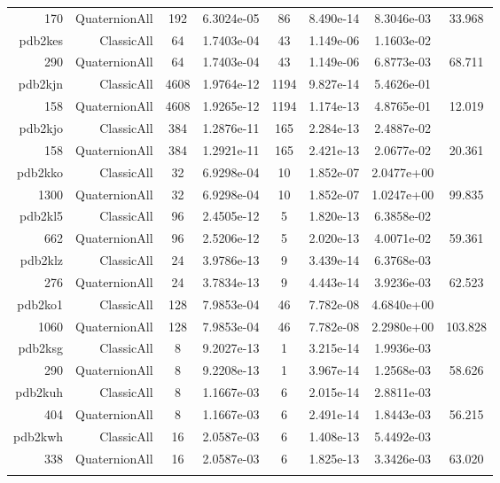 \begin{xltabular}{\textwidth}{r|rcS[table-format=1.4e+2]cS[table-format=1.3e+2]S[table-format=1.4e+2]S[table-format=-1.3]}
170 & QuaternionAll & 192 & 6.3024e-05 & 86 & 8.490e-14 & 8.3046e-03 & 33.968\\  \addlinespace
pdb2kes & ClassicAll & 64 & 1.7403e-04 & 43 & 1.149e-06 & 1.1603e-02 & \\
290 & QuaternionAll & 64 & 1.7403e-04 & 43 & 1.149e-06 & 6.8773e-03 & 68.711\\  \addlinespace
pdb2kjn & ClassicAll & 4608 & 1.9764e-12 & 1194 & 9.827e-14 & 5.4626e-01 & \\
158 & QuaternionAll & 4608 & 1.9265e-12 & 1194 & 1.174e-13 & 4.8765e-01 & 12.019\\  \addlinespace
pdb2kjo & ClassicAll & 384 & 1.2876e-11 & 165 & 2.284e-13 & 2.4887e-02 & \\
158 & QuaternionAll & 384 & 1.2921e-11 & 165 & 2.421e-13 & 2.0677e-02 & 20.361\\  \addlinespace
pdb2kko & ClassicAll & 32 & 6.9298e-04 & 10 & 1.852e-07 & 2.0477e+00 & \\
1300 & QuaternionAll & 32 & 6.9298e-04 & 10 & 1.852e-07 & 1.0247e+00 & 99.835\\  \addlinespace
pdb2kl5 & ClassicAll & 96 & 2.4505e-12 & 5 & 1.820e-13 & 6.3858e-02 & \\
662 & QuaternionAll & 96 & 2.5206e-12 & 5 & 2.020e-13 & 4.0071e-02 & 59.361\\  \addlinespace
pdb2klz & ClassicAll & 24 & 3.9786e-13 & 9 & 3.439e-14 & 6.3768e-03 & \\
276 & QuaternionAll & 24 & 3.7834e-13 & 9 & 4.443e-14 & 3.9236e-03 & 62.523\\  \addlinespace
pdb2ko1 & ClassicAll & 128 & 7.9853e-04 & 46 & 7.782e-08 & 4.6840e+00 & \\
1060 & QuaternionAll & 128 & 7.9853e-04 & 46 & 7.782e-08 & 2.2980e+00 & 103.828\\  \addlinespace
pdb2ksg & ClassicAll & 8 & 9.2027e-13 & 1 & 3.215e-14 & 1.9936e-03 & \\
290 & QuaternionAll & 8 & 9.2208e-13 & 1 & 3.967e-14 & 1.2568e-03 & 58.626\\  \addlinespace
pdb2kuh & ClassicAll & 8 & 1.1667e-03 & 6 & 2.015e-14 & 2.8811e-03 & \\
404 & QuaternionAll & 8 & 1.1667e-03 & 6 & 2.491e-14 & 1.8443e-03 & 56.215\\  \addlinespace
pdb2kwh & ClassicAll & 16 & 2.0587e-03 & 6 & 1.408e-13 & 5.4492e-03 & \\
338 & QuaternionAll & 16 & 2.0587e-03 & 6 & 1.825e-13 & 3.3426e-03 & 63.020\\  \addlinespace

\end{xltabular}
